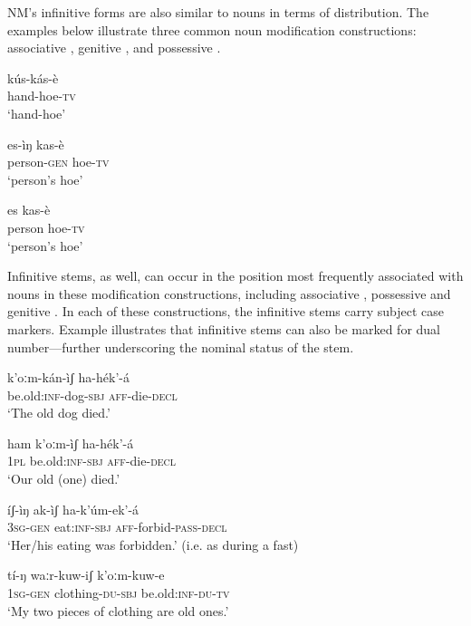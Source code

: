 \documentclass[output=paper]{langsci/langscibook}
\begin{document}
NM's infinitive forms are also similar to nouns in terms of distribution. The examples below illustrate three common noun modification constructions: associative , genitive , and possessive .

\ea\label{ex:mahland:26}
\gll kús-kás-è  \\
hand-hoe\textsc{{}-tv}\\
\glt `hand-hoe'
\z

\ea\label{ex:mahland:27}
\gll es-ìŋ            kas-è   \\
person\textsc{{}-gen}   hoe\textsc{{}-tv}\\
\glt `person's hoe'
\z

\ea\label{ex:mahland:28}
\gll es         kas-è  \\
person   hoe\textsc{{}-tv}\\
\glt `person's hoe'
\z

Infinitive stems, as well, can occur in the position most frequently associated with nouns in these modification constructions, including associative , possessive  and genitive . In each of these constructions, the infinitive stems carry subject case markers. Example  illustrates that infinitive stems can also be marked for dual number—further underscoring the nominal status of the stem.  

\ea\label{ex:mahland:29}
\gll k'oːm-kán-ìʃ           ha-hék'-{\downstep}á        \\
be.old:\textsc{inf}{}-dog-\textsc{sbj}   \textsc{aff}{}-die-\textsc{decl} \\
\glt `The old dog died.'
\z

\ea\label{ex:mahland:30}
\gll ham    k'oːm-ìʃ           ha-hék'-{\downstep}á      \\
\textsc{1pl}     be.old:\textsc{inf-sbj}  \textsc{aff}{}-die-\textsc{decl} \\
\glt `Our old (one) died.' 
\z

\ea\label{ex:mahland:31}
\gll íʃ-ìŋ          ak-ìʃ            ha-k'úm-{\downstep}ek'-á  \\
\textsc{3sg-gen}    eat:\textsc{inf-sbj}   \textsc{aff}{}-forbid-\textsc{pass-decl}\\
\glt `Her/his eating was forbidden.'  (i.e. as during a fast)
\z

\ea\label{ex:mahland:32}
\gll tí-ŋ            waːr-kuw-iʃ         k'oːm-kuw-e   \\
\textsc{1sg-gen}   clothing-\textsc{du-sbj}   be.old:\textsc{inf-du-tv}\\
\glt `My two pieces of clothing are old ones.'
\z
\end{document}
